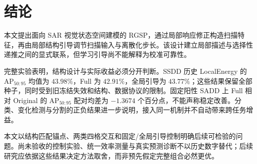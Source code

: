\documentclass[journal]{IEEEtran}
\begin{document}
\section{结论}\label{sec:conclusion}
本文提出面向 SAR 视觉状态空间建模的 RGSP，通过局部响应修正构造扫描特征，再由局部结构引导调节扫描输入与离散化步长。该设计建立局部描述与选择性递推之间的显式联系，但学习引导尚不能解释为校准可靠性。

完整实验表明，结构设计与实际收益必须分开判断。SSDD 历史 LocalEnergy 的 AP$_{50:95}$ 均值为 $43.98\%$，Full 为 $42.91\%$，全局引导为 $43.77\%$；这些结果保留全部种子，同时受到旧冻结失效和结构、数据协议的限制。固定阳性 SADD 上 Full 相对 Original 的 AP$_{50:95}$ 配对均差为 $-1.3674$ 个百分点，不能声称稳定改善。分类、变化检测与分割的正负结果进一步说明，接入同一机制并不自动带来跨任务增益。

本文以结构匹配锚点、两类四格交互和固定/全局引导控制明确后续可检验的问题。尚未验收的控制实验、统一效率测量与真实预测诊断不以历史数字替代；后续研究应依据这些结果决定方法取舍，而非预先假定完整组合必然更优。
\end{document}

